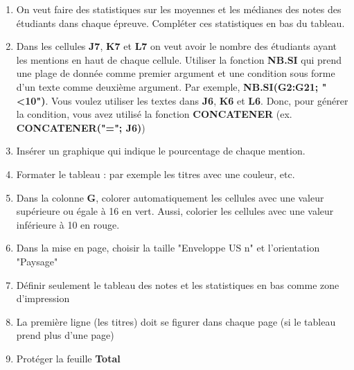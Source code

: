 \documentclass[11pt, a4paper]{article}
\begin{document}
\begin{enumerate}
	\item On veut faire des statistiques sur les moyennes et les médianes des notes des étudiants dans chaque épreuve. Compléter ces statistiques en bas du tableau. 
	\item Dans les cellules \textbf{J7}, \textbf{K7} et \textbf{L7} on veut avoir le nombre des étudiants ayant les mentions en haut de chaque cellule. Utiliser la fonction \textbf{NB.SI} qui prend une plage de donnée comme premier argument et une condition sous forme d'un texte comme deuxième argument. Par exemple, \textbf{NB.SI(G2:G21; "<10")}. Vous voulez utiliser les textes dans \textbf{J6}, \textbf{K6} et \textbf{L6}. Donc, pour générer la condition, vous avez utilisé la fonction \textbf{CONCATENER} (ex. \textbf{CONCATENER("="; J6)})
	\item Insérer un graphique qui indique le pourcentage de chaque mention. 
	\item Formater le tableau : par exemple les titres avec une couleur, etc. 
	\item Dans la colonne \textbf{G}, colorer automatiquement les cellules avec une valeur supérieure ou égale à 16 en vert. Aussi, colorier les cellules avec une valeur inférieure à 10 en rouge.
	\item Dans la mise en page, choisir la taille "Enveloppe US n" et l'orientation "Paysage"
	\item Définir seulement le tableau des notes et les statistiques en bas comme zone d'impression 
	\item La première ligne (les titres) doit se figurer dans chaque page (si le tableau prend plus d'une page)
	\item Protéger la feuille \textbf{Total}
\end{enumerate}
\end{document}
